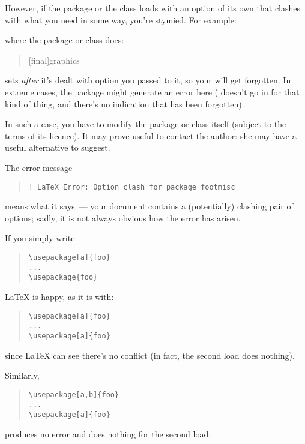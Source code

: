 However, if the  package or the  class loads
 with an option of its own that clashes with
what you need in some way, you're stymied.  For example:
\begin{quote}
\end{quote}
where the package or class does:
\begin{quote}
[final]{graphics}
\end{quote}
sets  \emph{after} it's dealt with option you passed to
it, so your  will get forgotten.  In extreme cases,
the package might generate an error here ( doesn't
go in for that kind of thing, and there's no indication that
 has been forgotten).

In such a case, you have to modify the package or class itself
(subject to the terms of its licence).  It may prove useful to contact
the author: she may have a useful alternative to suggest.


The error message
\begin{quote}
\begin{verbatim}
! LaTeX Error: Option clash for package footmisc
\end{verbatim}
\end{quote}
means what it says~--- your document contains a (potentially) clashing
pair of options; sadly, it is not always obvious how the error has
arisen.

If you simply write:
\begin{quote}
\begin{verbatim}
\usepackage[a]{foo}
...
\usepackage{foo}
\end{verbatim}
\end{quote}
\LaTeX{} is happy, as it is with:
\begin{quote}
\begin{verbatim}
\usepackage[a]{foo}
...
\usepackage[a]{foo}
\end{verbatim}
\end{quote}
since \LaTeX{} can see there's no conflict (in fact, the second load
does nothing).

Similarly,
\begin{quote}
\begin{verbatim}
\usepackage[a,b]{foo}
...
\usepackage[a]{foo}
\end{verbatim}
\end{quote}
produces no error and does nothing for the second load.

